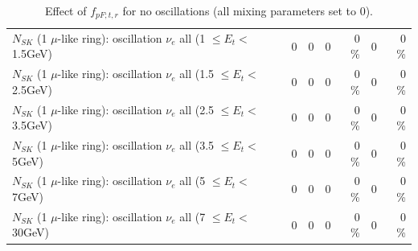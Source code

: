 \begin{table}
\begin{tabular}{| l | r | r | r  r | r  r |}
$N_{SK}$ (1 $\mu$-like ring): oscillation $\nu_{e}$ all (1 $\leq E_{t} <$ 1.5GeV) &               0 &               0 &               0 &        0 \%  &               0 &        0 \%  \\ 
$N_{SK}$ (1 $\mu$-like ring): oscillation $\nu_{e}$ all (1.5 $\leq E_{t} <$ 2.5GeV) &               0 &               0 &               0 &        0 \%  &               0 &        0 \%  \\ 
$N_{SK}$ (1 $\mu$-like ring): oscillation $\nu_{e}$ all (2.5 $\leq E_{t} <$ 3.5GeV) &               0 &               0 &               0 &        0 \%  &               0 &        0 \%  \\ 
$N_{SK}$ (1 $\mu$-like ring): oscillation $\nu_{e}$ all (3.5 $\leq E_{t} <$ 5GeV) &               0 &               0 &               0 &        0 \%  &               0 &        0 \%  \\ 
 $N_{SK}$ (1 $\mu$-like ring): oscillation $\nu_{e}$ all (5 $\leq E_{t} <$ 7GeV) &               0 &               0 &               0 &        0 \%  &               0 &        0 \%  \\ 
$N_{SK}$ (1 $\mu$-like ring): oscillation $\nu_{e}$ all (7 $\leq E_{t} <$ 30GeV) &               0 &               0 &               0 &        0 \%  &               0 &        0 \%  \\ 
\hline
\hline
\end{tabular}
\caption{ Effect of $f_{pF; t, r}$ for no oscillations (all mixing parameters set to 0). }
\label{tab:num_xsec_pf_1RmuT_3f_osc_t13:0}
\end{table}
\clearpage
